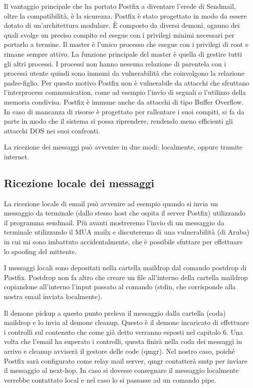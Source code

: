   Il vantaggio principale che ha portato Postfix a diventare l’erede di Sendmail, oltre la compatibilità, è la sicurezza. Postfix è stato progettato in modo da essere dotato di un’architettura modulare. È composto da diversi demoni, ognuno dei quali svolge un preciso compito ed esegue con i privilegi minimi necessari per portarlo a termine. Il  master è l’unico processo che esegue con i privilegi di root e rimane sempre attivo. La funzione principale del master è quella di gestire tutti gli altri processi. I processi non hanno nessuna relazione di parentela con i processi utente quindi sono immuni da vulnerabilità che coinvolgono la relazione padre-figlio. Per questo motivo Postfix non è vulnerabile da attacchi che sfruttano l’interprocess communication, come ad esempio l’invio di segnali o l’utilizzo della memoria condivisa. Postfix è immune anche da attacchi di tipo Buffer Overflow. In caso di mancanza di risorse è progettato per rallentare i suoi compiti, si fa da parte in modo che il sistema si possa riprendere, rendendo meno efficienti gli attacchi DOS nei suoi confronti.
  
  La ricezione dei messaggi può avvenire in due modi: localmente, oppure tramite internet.
  \subsection{Ricezione locale dei messaggi}
  La ricezione locale di email può avvenire ad esempio quando si invia un messaggio da terminale (dallo stesso host che ospita il server Postfix) utilizzando il programma sendmail. Più avanti mostreremo l’invio di un messaggio da terminale utilizzando il MUA mailx e discuteremo di una vulnerabilità (di Aruba) in cui mi sono imbattuto accidentalmente, che è possibile sfuttare per effettuare lo spoofing del mittente.
  
  I messaggi locali sono depositati nella cartella maildrop dal comando postdrop di Postfix. Postdrop non fa altro che creare un file all’interno della cartella maildrop copiandone all’interno l’input passato al comando (stdin, che corrisponde alla nostra email inviata localmente). 
  
  Il demone pickup a questo punto preleva il messaggio dalla cartella (coda) maildrop e lo invia al demone cleanup. Questo è il demone incaricato di effettuare i controlli sul contenuto che come già detto verranno esposti nel capitolo 6. Una volta che l’email ha superato i controlli, questa finirà nella coda dei messaggi in arrivo e cleanup avviserà il gestore delle code (qmgr). 
  Nel nostro caso, poiché Postfix sarà configurato come relay mail server, qmgr contatterà smtp per inviare il messaggio al next-hop. In caso si dovesse consegnare il messaggio localmente verrebbe contattato local e nel caso lo si passasse ad un comando pipe.
  
